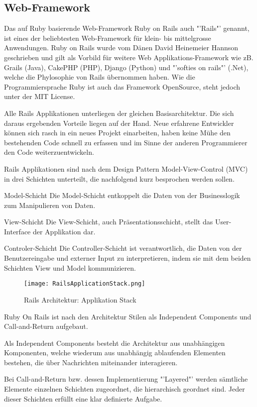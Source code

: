 \subsection{Web-Framework}
Das auf Ruby basierende Web-Framework Ruby on Rails auch "'Rails"' genannt, ist eines der beliebtesten Web-Framework für klein- bis mittelgrosse Anwendungen. Ruby on Rails wurde vom Dänen David Heinemeier Hannson geschrieben und gilt als Vorbild für weitere Web Applikations-Framework wie zB. Grails (Java), CakePHP (PHP), Django (Python) und "'softies on rails"' (.Net),  welche die Phylosophie von Rails übernommen haben. Wie die Programmiersprache Ruby ist auch das Framework OpenSource, steht jedoch unter der MIT License.

Alle Rails Applikationen unterliegen der gleichen Basisarchitektur. Die sich daraus ergebenden Vorteile liegen auf der Hand. Neue erfahrene Entwickler können sich rasch in ein neues Projekt einarbeiten, haben keine Mühe den bestehenden Code schnell zu erfassen und im Sinne der anderen Programmierer den Code weiterzuentwickeln. 

Rails Applikationen sind nach dem Design Pattern Model-View-Control (MVC) in drei Schichten unterteilt, die nachfolgend kurz besprochen werden sollen.

Model-Schicht
Die Model-Schicht entkoppelt die Daten von der Businesslogik zum Manipulieren von Daten.

View-Schicht
Die View-Schicht, auch Präsentationsschicht, stellt das User-Interface der Applikation dar. 

Controler-Schicht
Die Controller-Schicht ist verantwortlich, die Daten von der Benutzereingabe und externer Input zu interpretieren, indem sie mit dem beiden Schichten View und Model kommunizieren.

\begin{figure}[htb]
\centering
\texttt{[image: RailsApplicationStack.png]}
\caption{Rails Architektur: Applikation Stack}
\label{fig:Rails Applikation Stack}
\end{figure}
\nocite{Fisher200810}

Ruby On Rails ist nach den Architektur Stilen als Independent Components und Call-and-Return aufgebaut.

Als Independent Components besteht die Architektur aus unabhängigen Komponenten, welche wiederum aus unabhängig ablaufenden Elementen bestehen, die über Nachrichten miteinander interagieren. 

Bei Call-and-Return bzw. dessen Implementierung "'Layered"' werden sämtliche Elemente einzelnen Schichten zugeordnet, die hierarchisch geordnet sind. Jeder dieser Schichten erfüllt eine klar definierte Aufgabe.

